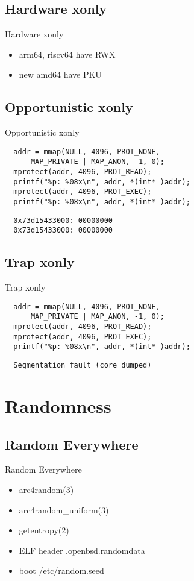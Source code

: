 \documentclass[14pt,aspectratio=169]{beamer}
\begin{document}
\subsection{Hardware xonly}
\begin{frame}{Hardware xonly}
\begin{itemize}
  \item arm64, riscv64 have RWX
  \item new amd64 have PKU
\end{itemize}
\end{frame}

\subsection{Opportunistic xonly}
\begin{frame}[fragile=singleslide]{Opportunistic xonly}
\begin{verbatim}
  addr = mmap(NULL, 4096, PROT_NONE,
      MAP_PRIVATE | MAP_ANON, -1, 0);
  mprotect(addr, 4096, PROT_READ);
  printf("%p: %08x\n", addr, *(int* )addr);
  mprotect(addr, 4096, PROT_EXEC);
  printf("%p: %08x\n", addr, *(int* )addr);
\end{verbatim}
\begin{verbatim}
  0x73d15433000: 00000000
  0x73d15433000: 00000000
\end{verbatim}
\end{frame}

\subsection{Trap xonly}
\begin{frame}[fragile=singleslide]{Trap xonly}
\begin{verbatim}
  addr = mmap(NULL, 4096, PROT_NONE,
      MAP_PRIVATE | MAP_ANON, -1, 0);
  mprotect(addr, 4096, PROT_READ);
  mprotect(addr, 4096, PROT_EXEC);
  printf("%p: %08x\n", addr, *(int* )addr);
\end{verbatim}
\begin{verbatim}
  Segmentation fault (core dumped)
\end{verbatim}
\end{frame}

\section{Randomness}

\subsection{Random Everywhere}
\begin{frame}{Random Everywhere}
\begin{itemize}
  \item arc4random(3)
  \item arc4random\_uniform(3)
  \item getentropy(2)
  \item ELF header .openbsd.randomdata
  \item boot /etc/random.seed
\end{itemize}
\end{frame}
\end{document}
